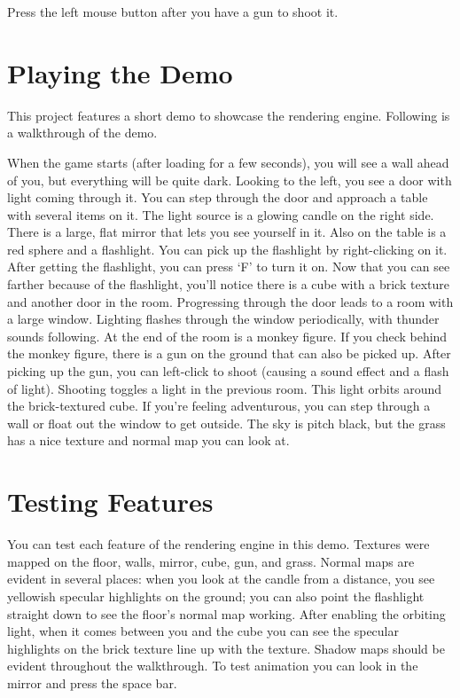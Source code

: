 \documentclass{book}
\begin{document}
      Press the left mouse button after you have a gun to shoot it.

  \section{Playing the Demo}
    This project features a short demo to showcase the rendering engine. Following is a walkthrough of the demo.

    When the game starts (after loading for a few seconds), you will see a wall ahead of you, but everything will be quite dark. Looking to the left, you see a door with light coming through it. You can step through the door and approach a table with several items on it. The light source is a glowing candle on the right side. There is a large, flat mirror that lets you see yourself in it. Also on the table is a red sphere and a flashlight. You can pick up the flashlight by right-clicking on it. After getting the flashlight, you can press `F' to turn it on. Now that you can see farther because of the flashlight, you'll notice there is a cube with a brick texture and another door in the room. Progressing through the door leads to a room with a large window. Lighting flashes through the window periodically, with thunder sounds following. At the end of the room is a monkey figure. If you check behind the monkey figure, there is a gun on the ground that can also be picked up. After picking up the gun, you can left-click to shoot (causing a sound effect and a flash of light). Shooting toggles a light in the previous room. This light orbits around the brick-textured cube. If you're feeling adventurous, you can step through a wall or float out the window to get outside. The sky is pitch black, but the grass has a nice texture and normal map you can look at.

  \section{Testing Features}
    You can test each feature of the rendering engine in this demo. Textures were mapped on the floor, walls, mirror, cube, gun, and grass. Normal maps are evident in several places: when you look at the candle from a distance, you see yellowish specular highlights on the ground; you can also point the flashlight straight down to see the floor's normal map working. After enabling the orbiting light, when it comes between you and the cube you can see the specular highlights on the brick texture line up with the texture. Shadow maps should be evident throughout the walkthrough. To test animation you can look in the mirror and press the space bar.
\end{document}
